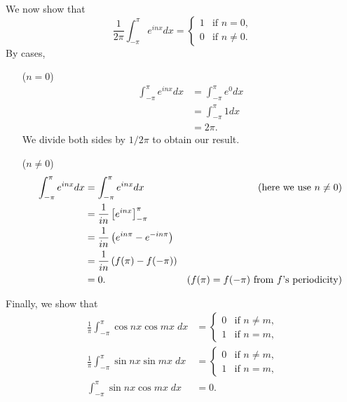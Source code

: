 \documentclass[oneside]{article}
\begin{document}
\begin{enumerate}[label=\textbf{\arabic*.}]
  We now show that \begin{equation}
    \label{eq:main-identity}
    \frac{1}{2\pi}\int_{-\pi}^\pi e^{inx} dx = \begin{cases}
      1 & \text{if }n = 0 \text{,} \\
      0 & \text{if }n \neq 0 \text{.}
    \end{cases}
  \end{equation} By cases,
  \begin{itemize}[leftmargin=37pt]
    \item[($n=0$)]
      \begin{align*}
        \int_{-\pi}^\pi e^{inx} dx
        &=\int_{-\pi}^\pi e^{0} dx \\
        &= \int_{-\pi}^\pi 1 dx \\
        &= 2\pi\text{.}
      \end{align*} We divide both sides by $1/2\pi$ to obtain our result.
    \item[($n\neq0$)] \begin{align*}
      \int_{-\pi}^\pi e^{inx} dx
      &= \int_{-\pi}^\pi e^{inx} dx &\text{(here we use $n\neq0$)} \\
      &= \frac{1}{in}\left[ e^{inx} \right]_{-\pi}^\pi \\
      &= \frac{1}{in}\left( e^{in\pi} - e^{-in\pi} \right) \\
      &= \frac{1}{in}\left( f(\pi) - f(-\pi) \right) \\
      &= 0\text. &\text{($f(\pi)=f(-\pi)$ from $f$'s periodicity)}
    \end{align*}
  \end{itemize}

  Finally, we show that \begin{align*}
    \frac{1}{\pi}\int_{-\pi}^{\pi} \cos nx \cos mx\;dx &= \begin{cases}
      0 & \text{if }n \neq m \text{,} \\
      1 & \text{if }n = m \text{,}
    \end{cases} \\
    \frac{1}{\pi}\int_{-\pi}^{\pi} \sin nx \sin mx\;dx &= \begin{cases}
      0 & \text{if }n \neq m \text{,} \\
      1 & \text{if }n = m \text{,}
    \end{cases} \\
    \int_{-\pi}^{\pi} \sin nx \cos mx\;dx &= 0\text{.}
  \end{align*}


\end{enumerate}
\end{document}
